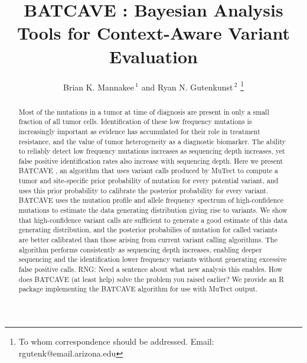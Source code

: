 \documentclass[a4,center,fleqn]{NAR}
\newcommand{\rngcomment}[1]{{\color{red}RNG: #1}}
\newcommand{\batcave}{BATCAVE }
\begin{document}
\title{\batcave: Bayesian Analysis Tools for Context-Aware Variant Evaluation}

\author{%
Brian K. Mannakee\,$^{1}$ and
Ryan N. Gutenkunst\,$^{2}$%
\footnote{To whom correspondence should be addressed.
Email: rgutenk@email.arizona.edu}}

\address{%
$^{1}$Mel and Enid Zuckerman College of Public Health, University of Arizona, Tucson AZ
and
$^{2}$Department of Molecular and Cellular Biology, University of Arizona, Tucson AZ}


\maketitle

\begin{abstract}
Most of the mutations in a tumor at time of diagnosis are present in only a small fraction of all tumor cells.
Identification of these low frequency mutations is increasingly important as evidence has accumulated for their role in treatment resistance, and the value of tumor heterogeneity as a diagnostic biomarker.
The ability to reliably detect low frequency mutations increases as sequencing depth increases, yet false positive identification rates also increase with sequencing depth.
Here we present \batcave, an algorithm that uses variant calls produced by MuTect to compute a tumor and site-specific prior probability of mutation for every potential variant, and uses this prior probability to calibrate the posterior probability for every variant.
\batcave uses the mutation profile and allele frequency spectrum of high-confidence mutations to estimate the data generating distribution giving rise to variants.
We show that high-confidence variant calls are sufficient to generate a good estimate of this data generating distribution, and the posterior probabilies of mutation for called variants are better calibrated than those arising from current variant calling algorithms.
The algorithm performs consistently as sequencing depth increases, enabling deeper sequencing and the identification lower frequency variants without generating excessive false positive calls.
\rngcomment{Need a sentence about what new analysis this enables. How does \batcave (at least help) solve the problem you raised earlier?}
We provide an R package implementing the \batcave algorithm for use with MuTect output.
\end{abstract}
\end{document}
